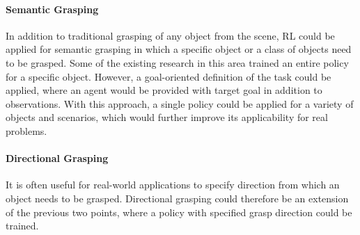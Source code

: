 \paragraph{Semantic Grasping} In addition to traditional grasping of any object from the scene, RL could be applied for semantic grasping in which a specific object or a class of objects need to be grasped. Some of the existing research in this area trained an entire policy for a specific object. However, a goal-oriented definition of the task could be applied, where an agent would be provided with target goal in addition to observations. With this approach, a single policy could be applied for a variety of objects and scenarios, which would further improve its applicability for real problems.

\paragraph{Directional Grasping} It is often useful for real-world applications to specify direction from which an object needs to be grasped. Directional grasping could therefore be an extension of the previous two points, where a policy with specified grasp direction could be trained.
